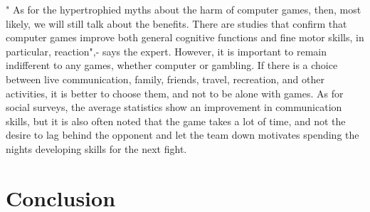 \documentclass[10pt,twoside,slovak,a4paper]{article}
\begin{document}
" As for the hypertrophied myths about the harm of computer games, then, most likely, we will still talk about the benefits. There are studies that confirm that computer games improve both general cognitive functions and fine motor skills, in particular, reaction",- says the expert.
However, it is important to remain indifferent to any games, whether computer or gambling. If there is a choice between live communication, family, friends, travel, recreation, and other activities, it is better to choose them, and not to be alone with games.
As for social surveys, the average statistics show an improvement in communication skills, but it is also often noted that the game takes a lot of time, and not the desire to lag behind the opponent and let the team down motivates spending the nights developing skills for the next fight.



\section{Conclusion} \label{conclusion} 
\end{document}
